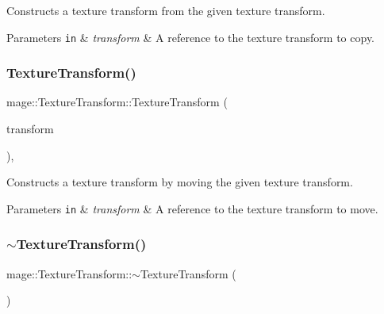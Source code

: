 Constructs a texture transform from the given texture transform.


\begin{DoxyParams}[1]{Parameters}
\mbox{\tt in}  & {\em transform} & A reference to the texture transform to copy. \\
\hline
\end{DoxyParams}
\mbox{\label{classmage_1_1_texture_transform_a37e8d4155e7c2bd4e8ebf282c855e2ae}} 
\subsubsection{\texorpdfstring{Texture\+Transform()}{TextureTransform()}\hspace{0.1cm}{\footnotesize\ttfamily [4/4]}}
{\footnotesize\ttfamily mage\+::\+Texture\+Transform\+::\+Texture\+Transform (\begin{DoxyParamCaption}\item[{\mbox{\hyperlink{classmage_1_1_texture_transform}{Texture\+Transform}} \&\&}]{transform }\end{DoxyParamCaption})\hspace{0.3cm}{\ttfamily [default]}, {\ttfamily [noexcept]}}

Constructs a texture transform by moving the given texture transform.


\begin{DoxyParams}[1]{Parameters}
\mbox{\tt in}  & {\em transform} & A reference to the texture transform to move. \\
\hline
\end{DoxyParams}
\mbox{\label{classmage_1_1_texture_transform_afb608ccc7bc107b893ea68937529a901}} 
\subsubsection{\texorpdfstring{$\sim$\+Texture\+Transform()}{~TextureTransform()}}
{\footnotesize\ttfamily mage\+::\+Texture\+Transform\+::$\sim$\+Texture\+Transform (\begin{DoxyParamCaption}{ }\end{DoxyParamCaption})\hspace{0.3cm}{\ttfamily [default]}}

